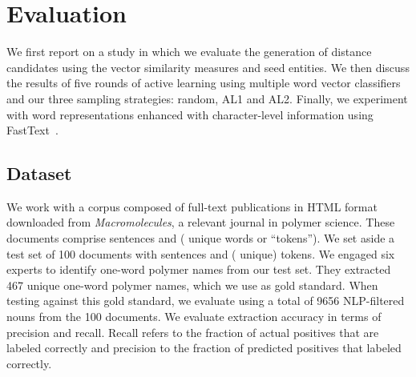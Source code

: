 \section{Evaluation}
\label{sect:apner_results}
We first report on a study in which we evaluate the generation of distance candidates using the vector similarity measures and seed entities. 
We then discuss the results of five rounds of active learning using multiple word vector classifiers and our three sampling strategies: random, AL1 and AL2.
Finally, we experiment with word representations enhanced with character-level information using FastText~\cite{bojanowski2016enriching,joulin2016bag}.

\subsection{Dataset}
We work with a corpus composed of  full-text publications in HTML format downloaded from \textit{Macromolecules}, a relevant journal in polymer science.
These documents comprise  sentences and  ( unique words or ``tokens'').
We set aside a test set of  100 documents with   sentences and  ( unique) tokens. 
We engaged six experts to identify one-word polymer names from our test set.
They extracted 467 unique one-word polymer names, which we use as gold standard.
When testing against this gold standard, we evaluate using a total of 9656 NLP-filtered nouns from the 100 documents.
We evaluate extraction accuracy in terms of precision and recall.
Recall refers to the fraction of actual positives that
are labeled correctly and precision to the fraction of predicted
positives that labeled correctly.

